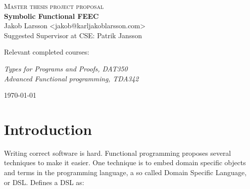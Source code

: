 \documentclass{scrartcl}
\begin{document}
\begin{titlepage}

\centering
{\scshape\LARGE Master thesis project proposal\\}
\vspace{0.5cm}
{\huge\bfseries Symbolic Functional FEEC\\}
\vspace{2cm}
{\Large Jakob Larsson <jakob@karljakoblarsson.com>\\}
\vspace{1.0cm}
{\large Suggested Supervisor at CSE: Patrik Jansson \\}
\vspace{1.5cm}
{\large Relevant completed courses:\par}
{\itshape
Types for Programs and Proofs, DAT350 \\
Advanced Functional programming, TDA342 \\
}

\vfill
{\large \today\\}
\end{titlepage}


%
%

\section{Introduction}



Writing correct software is hard.
Functional programming proposes several techniques to make it easier.
One technique is to embed domain specific objects and terms in the programming
language, a so called Domain Specific Language, or DSL.
\cite{van2000domain} Defines a DSL as:
\end{document}
